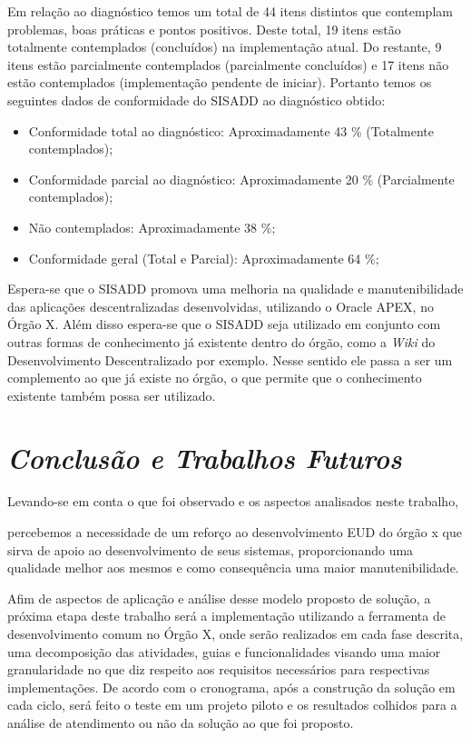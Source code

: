 Em relação ao diagnóstico temos um total de 44 itens distintos que contemplam problemas, boas práticas e pontos positivos. Deste total, 19 itens estão totalmente contemplados (concluídos) na implementação atual. Do restante, 9 itens estão parcialmente contemplados (parcialmente concluídos) e 17 itens não estão contemplados (implementação pendente de iniciar). Portanto temos os seguintes dados de conformidade do SISADD ao diagnóstico obtido:
\begin{itemize}
\item Conformidade total ao diagnóstico: Aproximadamente 43 \% (Totalmente contemplados);
\item Conformidade parcial ao diagnóstico: Aproximadamente 20 \% (Parcialmente contemplados);
\item Não contemplados: Aproximadamente 38 \%;
\item Conformidade geral (Total e Parcial): Aproximadamente 64 \%;
\end{itemize}

Espera-se que o SISADD promova uma melhoria na qualidade e manutenibilidade das aplicações descentralizadas desenvolvidas, utilizando o Oracle APEX, no Órgão X. Além disso espera-se que o SISADD seja utilizado em conjunto com outras formas de conhecimento já existente dentro do órgão, como a \textit{Wiki} do Desenvolvimento Descentralizado por exemplo. Nesse sentido ele passa a ser um complemento ao que já existe no órgão, o que permite que o conhecimento existente também possa ser utilizado.

\chapter{\textit{Conclusão e Trabalhos Futuros}}

Levando-se em conta o que foi observado e os aspectos analisados neste trabalho, 

percebemos a necessidade de um reforço ao desenvolvimento EUD do órgão x que sirva de apoio ao desenvolvimento de seus sistemas, proporcionando uma qualidade melhor aos mesmos e como consequência uma maior manutenibilidade.

Afim de aspectos de aplicação e análise desse modelo proposto de solução, a próxima etapa deste trabalho será a implementação utilizando a ferramenta de desenvolvimento comum no Órgão X, onde serão realizados em cada fase descrita, uma decomposição das atividades, guias e funcionalidades visando uma maior granularidade no que diz respeito aos requisitos necessários para respectivas implementações. De acordo com o cronograma, após a construção da solução em cada ciclo, será feito o teste em um projeto piloto e os resultados colhidos para a análise de atendimento ou não da solução ao que foi proposto.
